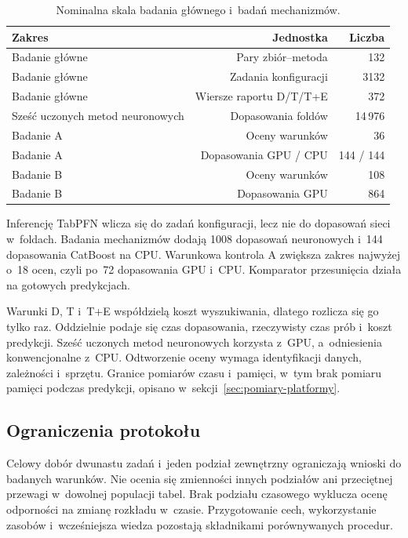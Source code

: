 \begin{table}[tbp]
\centering\small
\caption{Nominalna skala badania głównego i~badań mechanizmów.}
\label{tab:skala-badania}
\begin{tabularx}{\linewidth}{@{}Yrr@{}}
\toprule
Zakres & Jednostka & Liczba \\
\midrule
Badanie główne & Pary zbiór--metoda & 132 \\
Badanie główne & Zadania konfiguracji & 3132 \\
Badanie główne & Wiersze raportu D/T/T+E & 372 \\
Sześć uczonych metod neuronowych & Dopasowania foldów & 14\,976 \\
Badanie A & Oceny warunków & 36 \\
Badanie A & Dopasowania GPU / CPU & 144 / 144 \\
Badanie B & Oceny warunków & 108 \\
Badanie B & Dopasowania GPU & 864 \\
\bottomrule
\end{tabularx}
\end{table}

Inferencję TabPFN wlicza się do zadań konfiguracji, lecz nie do dopasowań sieci w~foldach. Badania mechanizmów dodają 1008 dopasowań neuronowych i~144 dopasowania CatBoost na CPU. Warunkowa kontrola A zwiększa zakres najwyżej o~18 ocen, czyli po~72 dopasowania GPU i~CPU. Komparator przesunięcia działa na gotowych predykcjach.

Warunki D, T i~T+E współdzielą koszt wyszukiwania, dlatego rozlicza się go tylko raz. Oddzielnie podaje się czas dopasowania, rzeczywisty czas prób i~koszt predykcji. Sześć uczonych metod neuronowych korzysta z~GPU, a~odniesienia konwencjonalne z~CPU. Odtworzenie oceny wymaga identyfikacji danych, zależności i~sprzętu. Granice pomiarów czasu i~pamięci, w~tym brak pomiaru pamięci podczas predykcji, opisano w~sekcji~\ref{sec:pomiary-platformy}.

\subsection{Ograniczenia protokołu}
\label{sec:ograniczenia-badania}

Celowy dobór dwunastu zadań i~jeden podział zewnętrzny ograniczają wnioski do badanych warunków. Nie ocenia się zmienności innych podziałów ani przeciętnej przewagi w~dowolnej populacji tabel. Brak podziału czasowego wyklucza ocenę odporności na zmianę rozkładu w~czasie. Przygotowanie cech, wykorzystanie zasobów i~wcześniejsza wiedza pozostają składnikami porównywanych procedur.

